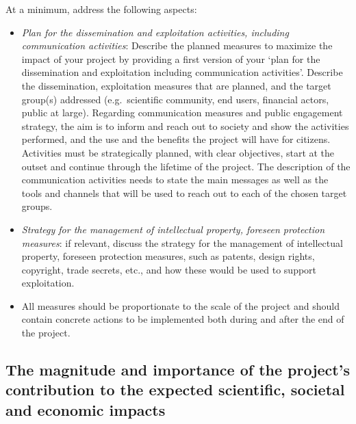 \documentclass[12pt,draftproposal]{msca-pf}
\begin{document}
\begin{mscaexplanation}
At a minimum, address the following aspects:

\begin{itemize}
    \item \emph{Plan for the dissemination and exploitation activities, including
    communication activities}\footnotemark{}: Describe the planned measures to
    maximize the impact of your project by providing a first version of your ‘plan
    for the dissemination and exploitation including communication activities’.
    Describe the dissemination, exploitation measures that are planned, and the target
    group(s) addressed (e.g.\ scientific community, end users, financial actors,
    public at large). Regarding communication measures and public engagement
    strategy, the aim is to inform and reach out to society and show the activities
    performed, and the use and the benefits the project will have for citizens.
    Activities must be strategically planned, with clear objectives, start at the
    outset and continue through the lifetime of the project. The description of
    the communication activities needs to state the main messages as well as the
    tools and channels that will be used to reach out to each of the chosen target
    groups.


    \item \emph{Strategy for the management of intellectual property, foreseen
    protection measures}: if relevant, discuss the strategy for the management
    of intellectual property, foreseen protection measures, such as patents,
    design rights, copyright, trade secrets, etc., and how these would be used
    to support exploitation.

    \item All measures should be proportionate to the scale of the project and
    should contain concrete actions to be implemented both during and after the
    end of the project.
\end{itemize}
\end{mscaexplanation}

\subsection{The magnitude and importance of the project’s contribution to the
    expected scientific, societal and economic impacts}
\label{ssc:impact:future}
\end{document}
